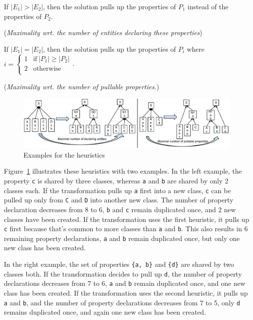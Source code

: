 \documentclass[submission]{eptcs}
\begin{document}
\begin{compactenum}
\item If $|E_1| > |E_2|$, then the solution pulls up the properties of $P_1$
  instead of the properties of $P_2$.

  (\emph{Maximality wrt. the number of entities declaring these properties})
\item If $|E_1| = |E_2|$, then the solution pulls up the properties of $P_i$
  where~$i = \left\{\begin{array}{ll}1 & \text{if}~|P_1| \geq |P_2|\\2 &
      \text{otherwise}\\ \end{array}\right.$.

  (\emph{Maximality wrt. the number of pullable properties.})
\end{compactenum}

\begin{figure}[h!tb]
  \centering
  \includegraphics[width=\linewidth]{heuristics-example}
  \caption{Examples for the heuristics}
  \label{fig:heuristics-example}
\end{figure}

Figure~\ref{fig:heuristics-example} illustrates these heuristics with two
examples.  In the left example, the property \verb|c| is shared by three
classes, whereas \verb|a| and \verb|b| are shared by only 2 classes each.  If
the transformation pulls up \verb|a| first into a new class, \verb|c| can be
pulled up only from \verb|C| and \verb|D| into another new class.  The number
of property declaration decreases from 8 to 6, \verb|b| and \verb|c| remain
duplicated once, and 2 new classes have been created.  If the transformation
uses the first heuristic, it pulls up \verb|c| first because that's common to
more classes than \verb|a| and \verb|b|.  This also results in 6 remaining
property declarations, \verb|a| and \verb|b| remain duplicated once, but only
one new class has been created.

In the right example, the set of properties \verb|{a, b}| and \verb|{d}| are
shared by two classes both.  If the transformation decides to pull up \verb|d|,
the number of property declarations decreases from 7 to 6, \verb|a| and
\verb|b| remain duplicated once, and one new class has been created.  If the
transformation uses the second heuristic, it pulls up \verb|a| and \verb|b|,
and the number of property declarations decreases from 7 to 5, only \verb|d|
remains duplicated once, and again one new class has been created.
\end{document}

